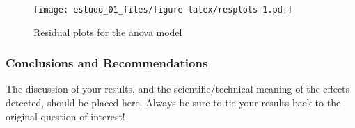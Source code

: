 \documentclass[
]{article}
\begin{document}
\begin{figure}
\centering
\texttt{[image: estudo\_01\_files/figure-latex/resplots-1.pdf]}
\caption{Residual plots for the anova model}
\end{figure}

\hypertarget{conclusions-and-recommendations}{%
\subsubsection{Conclusions and
Recommendations}\label{conclusions-and-recommendations}}

The discussion of your results, and the scientific/technical meaning of
the effects detected, should be placed here. Always be sure to tie your
results back to the original question of interest!
\end{document}
